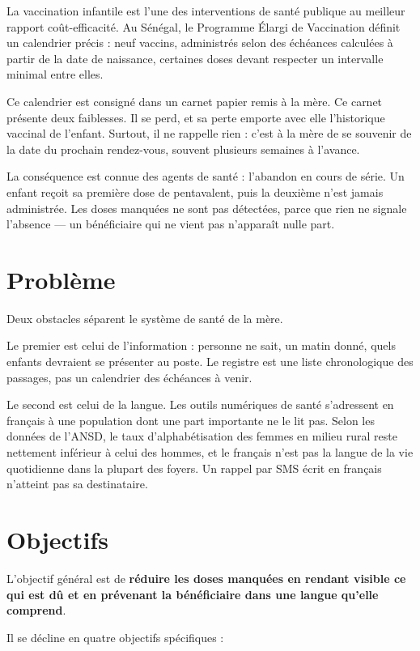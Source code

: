 \documentclass[11pt,a4paper]{report}
\begin{document}
La vaccination infantile est l'une des interventions de santé publique au
meilleur rapport coût-efficacité. Au Sénégal, le Programme Élargi de
Vaccination définit un calendrier précis : neuf vaccins, administrés selon
des échéances calculées à partir de la date de naissance, certaines doses
devant respecter un intervalle minimal entre elles.

Ce calendrier est consigné dans un carnet papier remis à la mère. Ce carnet
présente deux faiblesses. Il se perd, et sa perte emporte avec elle
l'historique vaccinal de l'enfant. Surtout, il ne rappelle rien : c'est à la
mère de se souvenir de la date du prochain rendez-vous, souvent plusieurs
semaines à l'avance.

La conséquence est connue des agents de santé : l'abandon en cours de série.
Un enfant reçoit sa première dose de pentavalent, puis la deuxième n'est
jamais administrée. Les doses manquées ne sont pas détectées, parce que rien
ne signale l'absence — un bénéficiaire qui ne vient pas n'apparaît nulle
part.

\section{Problème}

Deux obstacles séparent le système de santé de la mère.

Le premier est celui de l'information : personne ne sait, un matin donné,
quels enfants devraient se présenter au poste. Le registre est une liste
chronologique des passages, pas un calendrier des échéances à venir.

Le second est celui de la langue. Les outils numériques de santé s'adressent
en français à une population dont une part importante ne le lit pas. Selon
les données de l'ANSD, le taux d'alphabétisation des femmes en milieu rural
reste nettement inférieur à celui des hommes, et le français n'est pas la
langue de la vie quotidienne dans la plupart des foyers. Un rappel par SMS
écrit en français n'atteint pas sa destinataire.

\section{Objectifs}

L'objectif général est de \textbf{réduire les doses manquées en rendant
visible ce qui est dû et en prévenant la bénéficiaire dans une langue
qu'elle comprend}.

Il se décline en quatre objectifs spécifiques :
\end{document}
